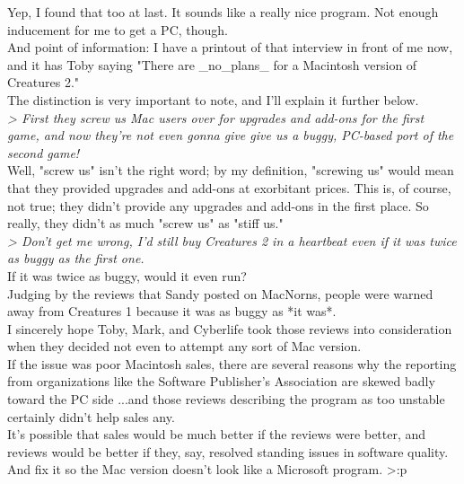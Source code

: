 \documentclass[11pt,twoside,a4paper]{article}
\begin{document}
\begin{multicols*}{2}
Yep, I found that too at last. It sounds like a really nice program. Not enough inducement for me to get a PC, though.~\\

And point of information: I have a printout of that interview in front of me now, and it has Toby saying "There are \_no\_plans\_ for a Macintosh version of Creatures 2."~\\

The distinction is very important to note, and I'll explain it further below.~\\

\emph{> First they screw us Mac users over for upgrades and add-ons for the first game, and now they're not even gonna give give us a buggy, PC-based port of the second game!}~\\

Well, "screw us" isn't the right word; by my definition, "screwing us" would mean that they provided upgrades and add-ons at exorbitant prices. This is, of course, not true; they didn't provide any upgrades and add-ons in the first place. So really, they didn't as much "screw us" as "stiff us."~\\

\emph{> Don't get me wrong, I'd still buy Creatures 2 in a heartbeat even if it was twice as buggy as the first one.}~\\

If it was twice as buggy, would it even run?~\\

Judging by the reviews that Sandy posted on MacNorns, people were warned away from Creatures 1 because it was as buggy as *it was*.~\\

I sincerely hope Toby, Mark, and Cyberlife took those reviews into consideration when they decided not even to attempt any sort of Mac version.~\\

If the issue was poor Macintosh sales, there are several reasons why the reporting from organizations like the Software Publisher's Association are skewed badly toward the PC side ...and those reviews describing the program as too unstable certainly didn't help sales any.~\\

It's possible that sales would be much better if the reviews were better, and reviews would be better if they, say, resolved standing issues in software quality. And fix it so the Mac version doesn't look like a Microsoft program. >:p~\\


\end{multicols*}
\end{document}
